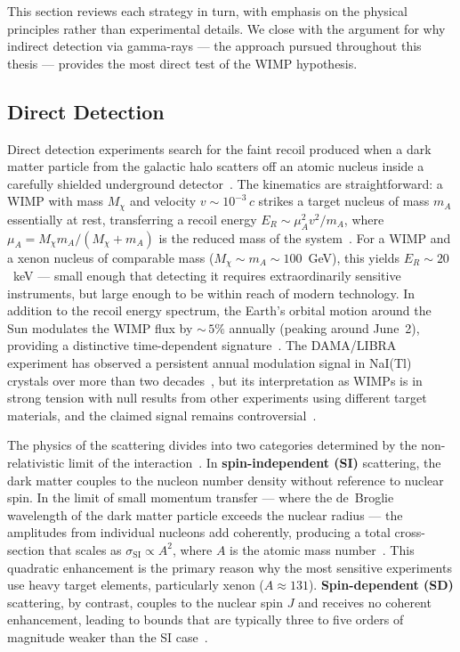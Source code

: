 This section reviews each strategy in turn, with emphasis on the physical principles rather than experimental details.
We close with the argument for why indirect detection via gamma-rays --- the approach pursued throughout this thesis --- provides the most direct test of the WIMP hypothesis.

\subsection{Direct Detection}
\label{sec:1.3.1}

Direct detection experiments search for the faint recoil produced when a dark matter particle from the galactic halo scatters off an atomic nucleus inside a carefully shielded underground detector~\cite{Cirelli:2024ssz}.
The kinematics are straightforward: a WIMP with mass $M_\chi$ and velocity $v \sim 10^{-3}\,c$ strikes a target nucleus of mass $m_A$ essentially at rest, transferring a recoil energy $E_R \sim \mu_A^2 v^2 / m_A$, where $\mu_A = M_\chi m_A / (M_\chi + m_A)$ is the reduced mass of the system~\cite{Cirelli:2024ssz}.
For a WIMP and a xenon nucleus of comparable mass ($M_\chi \sim m_A \sim 100$~GeV), this yields $E_R \sim 20$~keV --- small enough that detecting it requires extraordinarily sensitive instruments, but large enough to be within reach of modern technology.
In addition to the recoil energy spectrum, the Earth's orbital motion around the Sun modulates the WIMP flux by ${\sim}\,5\%$ annually (peaking around June~2), providing a distinctive time-dependent signature~\cite{Drukier:1986tm}.
The DAMA/LIBRA experiment has observed a persistent annual modulation signal in NaI(Tl) crystals over more than two decades~\cite{Bernabei:2018yyw}, but its interpretation as WIMPs is in strong tension with null results from other experiments using different target materials, and the claimed signal remains controversial~\cite{Cirelli:2024ssz}.

The physics of the scattering divides into two categories determined by the non-relativistic limit of the interaction~\cite{Cirelli:2024ssz,Hooper:2024}.
In \textbf{spin-independent (SI)} scattering, the dark matter couples to the nucleon number density without reference to nuclear spin.
In the limit of small momentum transfer --- where the de~Broglie wavelength of the dark matter particle exceeds the nuclear radius --- the amplitudes from individual nucleons add coherently, producing a total cross-section that scales as $\sigma_\text{SI} \propto A^2$, where $A$ is the atomic mass number~\cite{Cirelli:2024ssz,Hooper:2024}.
This quadratic enhancement is the primary reason why the most sensitive experiments use heavy target elements, particularly xenon ($A \approx 131$).
\textbf{Spin-dependent (SD)} scattering, by contrast, couples to the nuclear spin $J$ and receives no coherent enhancement, leading to bounds that are typically three to five orders of magnitude weaker than the SI case~\cite{Cirelli:2024ssz}.

